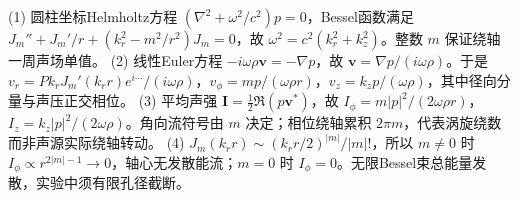 (1) 圆柱坐标Helmholtz方程 \((\nabla^2+\omega^2/c^2)p=0\)，Bessel函数满足 \(J_m''+J_m'/r+(k_r^2-m^2/r^2)J_m=0\)，故 \(\omega^2=c^2(k_r^2+k_z^2)\)。整数 \(m\) 保证绕轴一周声场单值。
(2) 线性Euler方程 \(-i\omega\rho\mathbf v=-\nabla p\)，故 \(\mathbf v=\nabla p/(i\omega\rho)\)。于是 \(v_r=Pk_rJ_m'(k_rr)e^{i\cdots}/(i\omega\rho)\)，\(v_\phi=mp/(\omega\rho r)\)，\(v_z=k_zp/(\omega\rho)\)，其中径向分量与声压正交相位。
(3) 平均声强 \(\mathbf I=\frac12\Re(p\mathbf v^*)\)，故 \(I_\phi=m|p|^2/(2\omega\rho r)\)，\(I_z=k_z|p|^2/(2\omega\rho)\)。角向流符号由 \(m\) 决定；相位绕轴累积 \(2\pi m\)，代表涡旋绕数而非声源实际绕轴转动。
(4) \(J_m(k_rr)\sim (k_rr/2)^{|m|}/|m|!\)，所以 \(m\ne0\) 时 \(I_\phi\propto r^{2|m|-1}\to0\)，轴心无发散能流；\(m=0\) 时 \(I_\phi=0\)。无限Bessel束总能量发散，实验中须有限孔径截断。
